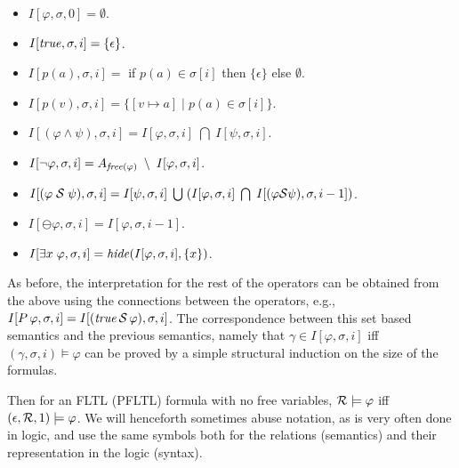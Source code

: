 \begin{itemize}
\item $I [ \varphi , \sigma , 0 ] = \emptyset$.
\item $I [ \mathit{true} , \sigma , i ] = \{ \epsilon \}$.
\item $I [ p ( a ) , \sigma , i ] =$ if $p ( a ) \in \sigma [ i ]$ then
$\{ \epsilon \}$ else $\emptyset$.
\item $I [ p ( v ) , \sigma , i ] = \{ [ v \mapsto a ] \; | \; p ( a ) \in
\sigma [ i ] \}$.
\item $I [ ( \varphi \wedge \psi ) , \sigma , i ] = 
I [ \varphi , \sigma , i ] \;  \bigcap \; I [ \psi , \sigma , i ]$.
\item $I [ \neg \varphi , \sigma , i ] = 
A_{\mathit{free} ( \varphi )} \; \setminus \; I [ \varphi , \sigma , i ]$.
\item $I [ ( \varphi \; {\cal S} \; \psi ) , \sigma , i ] = 
I [ \psi , \sigma , i ] \; \bigcup \;
( I [ \varphi , \sigma , i ] \; \bigcap \; 
I [ (\varphi {\cal S} \psi ) , \sigma , i - 1 ] )$.
\item $I [ \ominus \varphi , \sigma , i ] = I [ \varphi , \sigma , i-1 ]$.
\item $I [ \exists x \; \varphi , \sigma , i ] = 
\mathit{hide} ( I [ \varphi , \sigma , i ] , \{ x \} )$.
\end{itemize}

\noindent
As before, the interpretation for the rest of the operators can
be obtained from the above using the connections between the operators,
e.g., $I [ P \, \varphi  , \sigma , i ] = 
I [ ( \mathit{true} \, {\cal S} \, \varphi ) , \sigma , i ]$.
The correspondence between this set based semantics 
and the previous semantics, namely that
$\gamma \in I [ \varphi , \sigma, i ]$ iff
$( \gamma , \sigma , i ) \models \varphi$
can be proved by a simple structural induction on
the size of the formulas.
 \fi

Then for an FLTL (PFLTL) formula with no free variables, ${\cal R} \models \varphi$ iff $( \epsilon , {\cal R} , 1 ) \models \varphi$.
We will henceforth sometimes abuse notation, as is very often done in logic, and use the same
symbols both for the relations (semantics) and their representation in
the logic (syntax).


